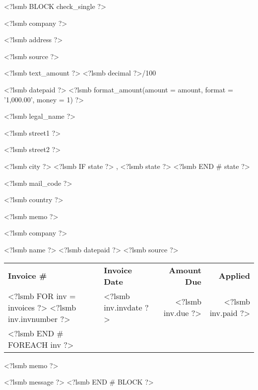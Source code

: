 <?lsmb BLOCK check_single ?>
\parbox[t]{12cm}{
  <?lsmb company ?>

  <?lsmb address ?>}
\hfill
\parbox[t]{6cm}{\hfill <?lsmb source ?>}

\vspace*{0.6cm}

<?lsmb text_amount ?> \dotfill <?lsmb decimal ?>/100 \makebox[0.5cm]{\hfill}

\vspace{0.5cm}

\hfill <?lsmb datepaid ?> \makebox[2cm]{\hfill} <?lsmb 
format_amount({amount = amount, format = '1,000.00', money = 1}) ?>


\vspace{0.5cm}

<?lsmb legal_name ?>

<?lsmb street1 ?>

<?lsmb street2 ?>

<?lsmb city ?>
<?lsmb IF state ?>
\hspace{-0.1cm}, <?lsmb state ?>
<?lsmb END # state ?>

<?lsmb mail_code ?>

<?lsmb country ?>

\vspace{1.8cm}

<?lsmb memo ?>

\vspace{0.8cm}

<?lsmb company ?>

\vspace{0.5cm}

<?lsmb name ?> \hfill <?lsmb datepaid ?> \hfill <?lsmb source ?>

\vspace{0.5cm}
\begin{tabularx}{\textwidth}{lXrr@{}}
\textbf{Invoice \#} & \textbf{Invoice Date}
  & \textbf{Amount Due} & \textbf{Applied} \\
<?lsmb FOR inv = invoices ?>
<?lsmb inv.invnumber ?> & <?lsmb inv.invdate ?> \dotfill
  & <?lsmb inv.due ?> & <?lsmb inv.paid ?> \\
<?lsmb END # FOREACH inv ?>
\end{tabularx}

\vspace{1cm}

<?lsmb memo ?>

\vfill
<?lsmb message ?>
<?lsmb END # BLOCK ?>
